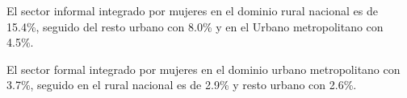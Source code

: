 El  sector informal integrado por mujeres en el dominio rural nacional es de 15.4\%, seguido del resto urbano con 8.0\% y en el Urbano metropolitano con 4.5\%. 

El  sector formal integrado por mujeres en el dominio urbano metropolitano con 3.7\%, seguido en el rural nacional es de 2.9\% y resto urbano con 2.6\%.